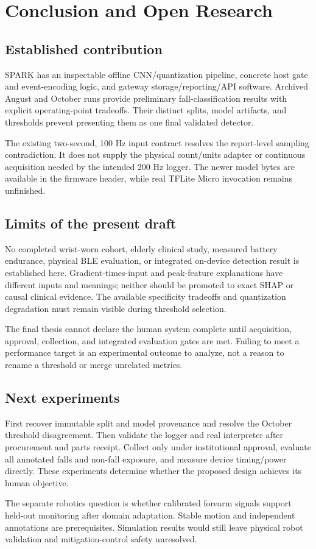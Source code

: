 \chapter{Conclusion and Open Research}
\section{Established contribution}
SPARK has an inspectable offline CNN/quantization pipeline, concrete host gate and event-encoding logic, and gateway storage/reporting/API software. Archived August and October runs provide preliminary fall-classification results with explicit operating-point tradeoffs. Their distinct splits, model artifacts, and thresholds prevent presenting them as one final validated detector.

The existing two-second, 100 Hz input contract resolves the report-level sampling contradiction. It does not supply the physical count/units adapter or continuous acquisition needed by the intended 200 Hz logger. The newer model bytes are available in the firmware header, while real TFLite Micro invocation remains unfinished.

\section{Limits of the present draft}
No completed wrist-worn cohort, elderly clinical study, measured battery endurance, physical BLE evaluation, or integrated on-device detection result is established here. Gradient-times-input and peak-feature explanations have different inputs and meanings; neither should be promoted to exact SHAP or causal clinical evidence. The available specificity tradeoffs and quantization degradation must remain visible during threshold selection.

The final thesis cannot declare the human system complete until acquisition, approval, collection, and integrated evaluation gates are met. Failing to meet a performance target is an experimental outcome to analyze, not a reason to rename a threshold or merge unrelated metrics.

\section{Next experiments}
First recover immutable split and model provenance and resolve the October threshold disagreement. Then validate the logger and real interpreter after procurement and parts receipt. Collect only under institutional approval, evaluate all annotated falls and non-fall exposure, and measure device timing/power directly. These experiments determine whether the proposed design achieves its human objective.

The separate robotics question is whether calibrated forearm signals support held-out monitoring after domain adaptation. Stable motion and independent annotations are prerequisites. Simulation results would still leave physical robot validation and mitigation-control safety unresolved.
